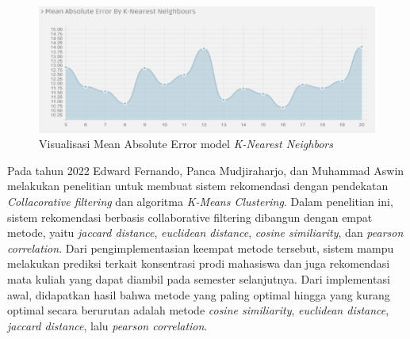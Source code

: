 \begin{figure} [ht] \centering
  \includegraphics[width=160mm]{gambar/mae-knn.png}
  \vspace*{2mm}
  \caption{Visualisasi Mean Absolute Error model \emph{K-Nearest Neighbors} \citep{cosineSimilarity}}
\end{figure}

Pada tahun 2022 Edward Fernando, Panca Mudjiraharjo, dan Muhammad Aswin melakukan penelitian untuk membuat sistem rekomendasi
dengan pendekatan \emph{Collacorative filtering} dan algoritma \emph{K-Means Clustering}. Dalam penelitian ini, sistem rekomendasi
berbasis collaborative filtering dibangun dengan empat metode, yaitu \emph{jaccard distance}, \emph{euclidean distance}, \emph{cosine similiarity}, dan \emph{pearson correlation}.
Dari pengimplementasian keempat metode tersebut, sistem mampu melakukan prediksi terkait konsentrasi prodi mahasiswa dan juga rekomendasi mata kuliah
yang dapat diambil pada semester selanjutnya. Dari implementasi awal, didapatkan hasil bahwa metode yang paling optimal hingga yang kurang optimal
secara berurutan adalah metode \emph{cosine similiarity}, \emph{euclidean distance}, \emph{jaccard distance}, lalu \emph{pearson correlation}.

